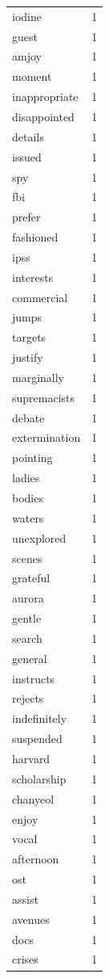 \begin{tabular}{lr}
iodine & 1 \\
guest & 1 \\
amjoy & 1 \\
moment & 1 \\
inappropriate & 1 \\
disappointed & 1 \\
details & 1 \\
issued & 1 \\
spy & 1 \\
fbi & 1 \\
prefer & 1 \\
fashioned & 1 \\
ipss & 1 \\
interests & 1 \\
commercial & 1 \\
jumps & 1 \\
targets & 1 \\
justify & 1 \\
marginally & 1 \\
supremacists & 1 \\
debate & 1 \\
extermination & 1 \\
pointing & 1 \\
ladies & 1 \\
bodies & 1 \\
waters & 1 \\
unexplored & 1 \\
scenes & 1 \\
grateful & 1 \\
aurora & 1 \\
gentle & 1 \\
search & 1 \\
general & 1 \\
instructs & 1 \\
rejects & 1 \\
indefinitely & 1 \\
suspended & 1 \\
harvard & 1 \\
scholarship & 1 \\
chanyeol & 1 \\
enjoy & 1 \\
vocal & 1 \\
afternoon & 1 \\
ost & 1 \\
assist & 1 \\
avenues & 1 \\
docs & 1 \\
crises & 1 \\

\end{tabular}
